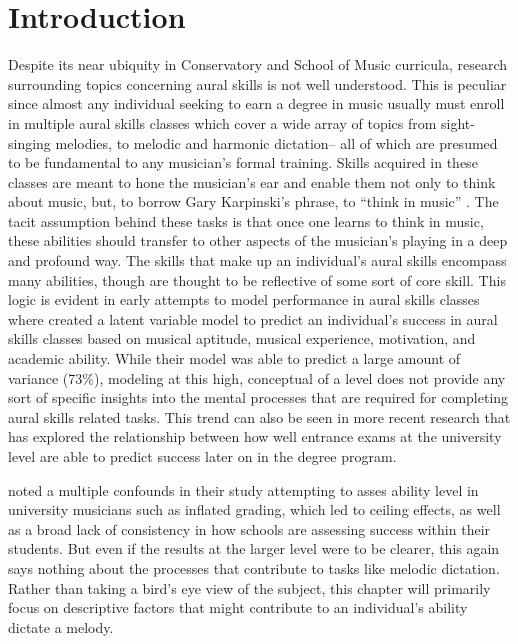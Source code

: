 \documentclass[]{book}
\begin{document}
\hypertarget{introduction}{%
\section{Introduction}\label{introduction}}

Despite its near ubiquity in Conservatory and School of Music curricula, research surrounding topics concerning aural skills is not well understood.
This is peculiar since almost any individual seeking to earn a degree in music usually must enroll in multiple aural skills classes which cover a wide array of topics from sight-singing melodies, to melodic and harmonic dictation-- all of which are presumed to be fundamental to any musician's formal training.
Skills acquired in these classes are meant to hone the musician's ear and enable them not only to think about music, but, to borrow Gary Karpinski's phrase, to ``think in music'' \citep[p.4]{karpinskiAuralSkillsAcquisition2000}.
The tacit assumption behind these tasks is that once one learns to think in music, these abilities should transfer to other aspects of the musician's playing in a deep and profound way.
The skills that make up an individual's aural skills encompass many abilities, though are thought to be reflective of some sort of core skill.
This logic is evident in early attempts to model performance in aural skills classes where \citet{harrisonEffectsMusicalAptitude1994} created a latent variable model to predict an individual's success in aural skills classes based on musical aptitude, musical experience, motivation, and academic ability.
While their model was able to predict a large amount of variance (73\%), modeling at this high, conceptual of a level does not provide any sort of specific insights into the mental processes that are required for completing aural skills related tasks.
This trend can also be seen in more recent research that has explored the relationship between how well entrance exams at the university level are able to predict success later on in the degree program.

\citet{wolfGradesReflectDevelopment2014} noted a multiple confounds in their study attempting to asses ability level in university musicians such as inflated grading, which led to ceiling effects, as well as a broad lack of consistency in how schools are assessing success within their students.
But even if the results at the larger level were to be clearer, this again says nothing about the processes that contribute to tasks like melodic dictation.
Rather than taking a bird's eye view of the subject, this chapter will primarily focus on descriptive factors that might contribute to an individual's ability dictate a melody.
\end{document}
